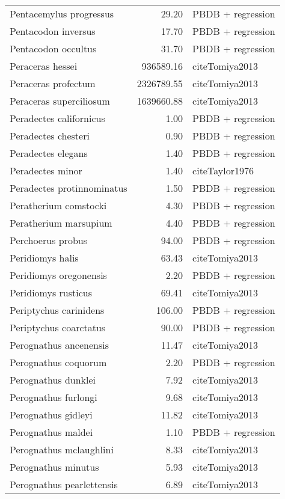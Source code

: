 \begin{table}[ht]
\begin{tabular}{lrl}
  Pentacemylus progressus & 29.20 & PBDB + regression \\ 
  Pentacodon inversus & 17.70 & PBDB + regression \\ 
  Pentacodon occultus & 31.70 & PBDB + regression \\ 
  Peraceras hessei & 936589.16 & cite{Tomiya2013} \\ 
  Peraceras profectum & 2326789.55 & cite{Tomiya2013} \\ 
  Peraceras superciliosum & 1639660.88 & cite{Tomiya2013} \\ 
  Peradectes californicus & 1.00 & PBDB + regression \\ 
  Peradectes chesteri & 0.90 & PBDB + regression \\ 
  Peradectes elegans & 1.40 & PBDB + regression \\ 
  Peradectes minor & 1.40 & cite{Taylor1976} \\ 
  Peradectes protinnominatus & 1.50 & PBDB + regression \\ 
  Peratherium comstocki & 4.30 & PBDB + regression \\ 
  Peratherium marsupium & 4.40 & PBDB + regression \\ 
  Perchoerus probus & 94.00 & PBDB + regression \\ 
  Peridiomys halis & 63.43 & cite{Tomiya2013} \\ 
  Peridiomys oregonensis & 2.20 & PBDB + regression \\ 
  Peridiomys rusticus & 69.41 & cite{Tomiya2013} \\ 
  Periptychus carinidens & 106.00 & PBDB + regression \\ 
  Periptychus coarctatus & 90.00 & PBDB + regression \\ 
  Perognathus ancenensis & 11.47 & cite{Tomiya2013} \\ 
  Perognathus coquorum & 2.20 & PBDB + regression \\ 
  Perognathus dunklei & 7.92 & cite{Tomiya2013} \\ 
  Perognathus furlongi & 9.68 & cite{Tomiya2013} \\ 
  Perognathus gidleyi & 11.82 & cite{Tomiya2013} \\ 
  Perognathus maldei & 1.10 & PBDB + regression \\ 
  Perognathus mclaughlini & 8.33 & cite{Tomiya2013} \\ 
  Perognathus minutus & 5.93 & cite{Tomiya2013} \\ 
  Perognathus pearlettensis & 6.89 & cite{Tomiya2013} \\ 

\end{tabular}
\end{table}
